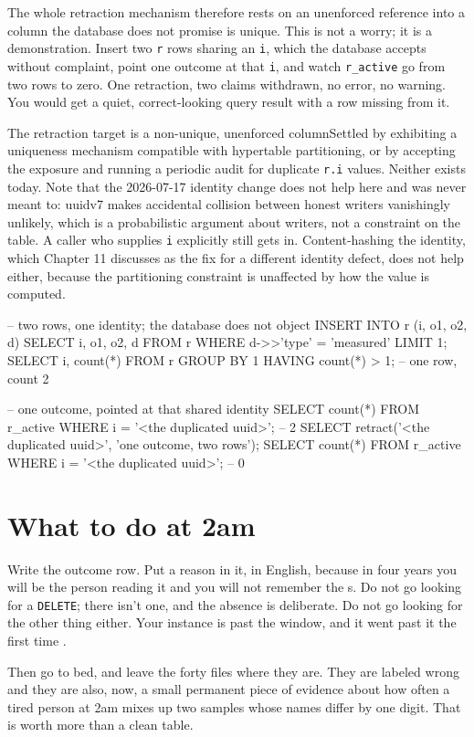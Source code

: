 The whole retraction mechanism therefore rests on an unenforced reference into a column the database does not promise is unique. This is not a worry; it is a demonstration. Insert two \texttt{r} rows sharing an \texttt{i}, which the database accepts without complaint, point one outcome at that \texttt{i}, and watch \texttt{r\_active} go from two rows to zero. One retraction, two claims withdrawn, no error, no warning. You would get a quiet, correct-looking query result with a row missing from it.

\begin{Open}{The retraction target is a non-unique, unenforced column}{Settled by exhibiting a uniqueness mechanism compatible with hypertable partitioning, or by accepting the exposure and running a periodic audit for duplicate \texttt{r.i} values.}
Neither exists today. Note that the 2026-07-17 identity change does not help here and was never meant to: uuidv7 makes accidental collision between honest writers vanishingly unlikely, which is a probabilistic argument about writers, not a constraint on the table. A caller who supplies \texttt{i} explicitly still gets in. Content-hashing the identity, which Chapter 11 discusses as the fix for a different identity defect, does not help either, because the partitioning constraint is unaffected by how the value is computed.
\begin{Check}
-- two rows, one identity; the database does not object
INSERT INTO r (i, o1, o2, d)
SELECT i, o1, o2, d FROM r WHERE d->>'type' = 'measured' LIMIT 1;
SELECT i, count(*) FROM r GROUP BY 1 HAVING count(*) > 1;   -- one row, count 2

-- one outcome, pointed at that shared identity
SELECT count(*) FROM r_active WHERE i = '<the duplicated uuid>';   -- 2
SELECT retract('<the duplicated uuid>', 'one outcome, two rows');
SELECT count(*) FROM r_active WHERE i = '<the duplicated uuid>';   -- 0
\end{Check}
\end{Open}

\section{What to do at 2am}

Write the outcome row. Put a reason in it, in English, because in four years you will be the person reading it and you will not remember the \labSampleCarrier{}s. Do not go looking for a \texttt{DELETE}; there isn't one, and the absence is deliberate. Do not go looking for the other thing either. Your instance is past the window, and it went past it the first time \labColdSystemColloquial{} \labColdOnset{}.

Then go to bed, and leave the forty files where they are. They are labeled wrong and they are also, now, a small permanent piece of evidence about how often a tired person at 2am mixes up two samples whose names differ by one digit. That is worth more than a clean table.
